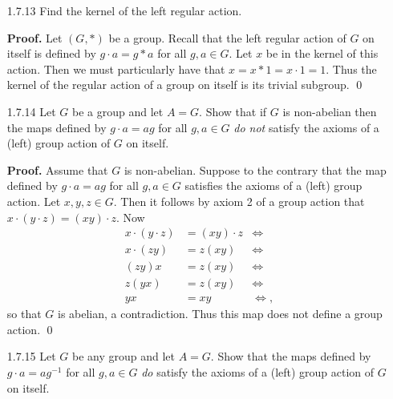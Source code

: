 \begin{enumerate}
      Now consider a pair of vertices $\{x, x + k\} \in P$. It follows that
      $$r \cdot \{x, x + k\} = \{(x + 1, x + k + 1\} \in P$$
      because $x + k + 1 - (x + 1) = k$. Assume $x = 1$. Since $s$ fixes 1 and
      $k + 1$, it must also fix $\{x, x + 1\}$. Now assume $2 \le x \le k$. Thus
      $$s \cdot \{x, x + k\} = \{2k+2 - x, 2k+2-x-k\} \in P.$$
      We have thus shown that $r$ and $s$ send every opposite pair to another
      opposite pair; since $r$ and $s$ generate it follows that every member of
      $D_{2n}$ maps an opposite pair to another opposite pair. Since we are
      regarding $r$ and $s$ as permutations in $S_n$, axiom 2 immediately
      follows by the composition of permutations. The kernel of this action is
      $\{1, r^k\}$. \qed
   \item[1.7.13]  Find the kernel of the left regular action.

      \textbf{Proof.} Let $(G, *)$ be a group. Recall that the left regular 
      action of $G$ on itself is defined by $g \cdot a = g * a$ for all
      $g, a \in G$. Let $x$ be in the kernel of this action. Then we must
      particularly have that $x = x * 1 = x \cdot 1 = 1$. Thus the kernel of the
      regular action of a group on itself is its trivial subgroup.
      \qed
   \item[1.7.14]  Let $G$ be a group and let $A = G$. Show that if $G$ is
                  non-abelian then the maps defined by $g \cdot a = ag$ for all
                  $g, a \in G$ \textit{do not} satisfy the axioms of a (left)
                  group action of $G$ on itself.

      \textbf{Proof.} Assume that $G$ is non-abelian. Suppose to the contrary 
      that the map defined by $g \cdot a = ag$ for all $g, a \in G$ satisfies
      the axioms of a (left) group action. Let $x, y, z \in G$. Then it follows
      by axiom 2 of a group action that $x \cdot (y \cdot z) = (xy) \cdot z$.
      Now
      \begin{align*}
         x \cdot (y \cdot z) &= (xy)\cdot z &\Longleftrightarrow \\
         x \cdot (zy) &= z(xy) &\Longleftrightarrow \\
         (zy)x &= z(xy) &\Longleftrightarrow \\
         z(yx) &= z(xy) &\Longleftrightarrow \\
         yx &= xy &\Longleftrightarrow,
      \end{align*}
      so that $G$ is abelian, a contradiction. Thus this map does not define a
      group action. \qed
   \item[1.7.15]  Let $G$ be any group and let $A = G$. Show that the maps
                  defined by $g \cdot a = ag^{-1}$ for all $g, a \in G$
                  \textit{do} satisfy the axioms of a (left) group action of $G$
                  on itself.


\end{enumerate}

